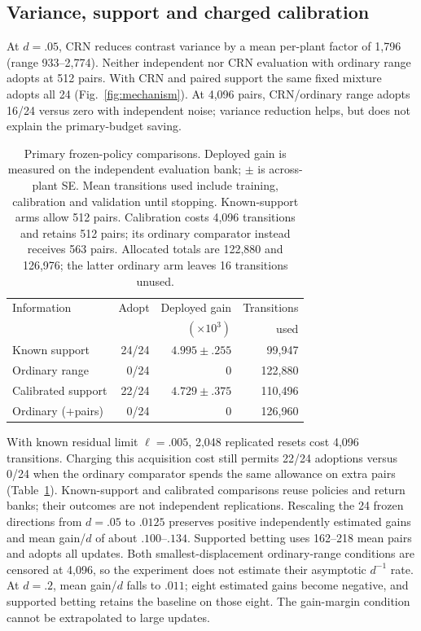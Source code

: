 \documentclass[twocolumn,nameyear]{autart}
\begin{document}
\subsection{Variance, support and charged calibration}
At $d=.05$, CRN reduces contrast variance by a mean per-plant factor of
1,796 (range 933--2,774). Neither independent nor CRN evaluation with
ordinary range adopts at 512 pairs. With CRN and paired support the same
fixed mixture adopts all 24 (Fig.~\ref{fig:mechanism}). At 4,096 pairs,
CRN/ordinary range adopts 16/24 versus zero with independent noise;
variance reduction helps, but does not explain the primary-budget saving.

\begin{table}[t]
\centering\small
\begin{tabular}{@{}lrrr@{}}
\toprule
Information & Adopt & Deployed gain & Transitions\\
 & & $(\times10^3)$ & used\\
\midrule
Known support & 24/24 & $4.995\pm.255$ & 99,947\\
Ordinary range & 0/24 & $0$ & 122,880\\
Calibrated support & 22/24 & $4.729\pm.375$ & 110,496\\
Ordinary (+pairs) & 0/24 & $0$ & 126,960\\
\bottomrule
\end{tabular}
\caption{Primary frozen-policy comparisons. Deployed gain is measured
on the independent evaluation bank; $\pm$ is across-plant SE.
Mean transitions used include training, calibration and validation until
stopping. Known-support arms allow 512 pairs. Calibration costs 4,096
transitions and retains 512 pairs; its ordinary comparator instead
receives 563 pairs. Allocated totals are 122,880 and 126,976; the latter
ordinary arm leaves 16 transitions unused.}
\label{tab:primary}
\end{table}

With known residual limit $\ell=.005$, 2,048 replicated resets cost
4,096 transitions. Charging this acquisition cost still permits 22/24
adoptions versus 0/24 when the ordinary comparator spends the same
allowance on extra pairs (Table~\ref{tab:primary}). Known-support and
calibrated comparisons reuse policies and return banks; their outcomes
are not independent replications.
Rescaling the 24 frozen directions from $d=.05$ to $.0125$ preserves
positive independently estimated gains and mean gain/$d$ of about
$.100$--$.134$. Supported betting uses 162--218 mean pairs and adopts
all updates. Both smallest-displacement ordinary-range conditions are
censored at 4,096, so the experiment does not estimate their asymptotic
$d^{-1}$ rate. At $d=.2$, mean gain/$d$ falls to $.011$; eight estimated
gains become negative, and supported betting retains the baseline on
those eight. The gain-margin condition cannot be extrapolated to large
updates.
\end{document}
